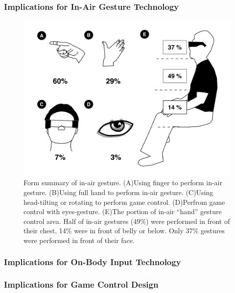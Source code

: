 \documentclass{sigchi}
\begin{document}
    \subsubsection{Implications for In-Air Gesture Technology}
  \begin{figure}[!h]
  \centering
  \includegraphics[width=1\columnwidth]{InAirControlArea.pdf}
  \caption{Form summary of in-air gesture. (A)Using finger to perform in-air gesture. (B)Using full hand to perform in-air gesture. (C)Using head-tilting or rotating to perform game control. (D)Perfrom game control with eyes-gesture. (E)The portion of in-air ``hand'' gesture control area. Half of in-air gestures (49\%) were performed in front of their chest, 14\% were in front of belly or below. Only 37\% gestures were performed in front of their face.}
  \label{fig:figureInAirPorpotion}
  \end{figure}
  \subsubsection{Implications for On-Body Input Technology}

  \subsubsection{Implications for Game Control Design}
\end{document}
